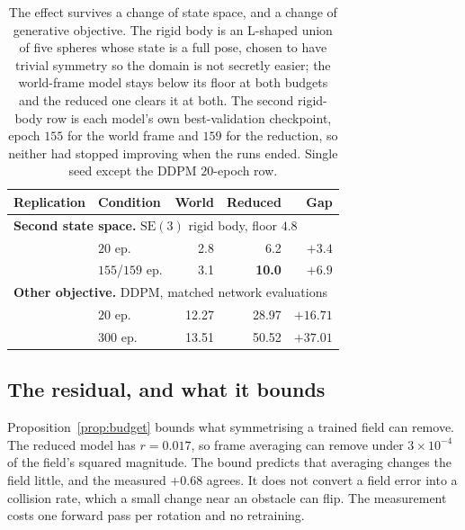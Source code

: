 \documentclass[conference]{IEEEtran}
\newcommand{\SE}{\mathrm{SE}(3)}
\begin{document}
\begin{table}[t]
\centering
\footnotesize
\setlength{\tabcolsep}{3.5pt}
\begin{tabular}{@{}llrrr@{}}
\toprule
Replication & Condition & World & Reduced & Gap \\
\midrule
\multicolumn{5}{l}{\textbf{Second state space.} $\SE$ rigid body, floor $4.8$}\\
            & $20$ ep.       & 2.8 & 6.2 & $+3.4$ \\
            & $155$/$159$ ep.& 3.1 & \textbf{10.0} & $+6.9$ \\
\midrule
\multicolumn{5}{l}{\textbf{Other objective.} DDPM, matched network evaluations}\\
            & $20$ ep.       & 12.27 & 28.97 & $+16.71$ \\
            & $300$ ep.      & 13.51 & 50.52 & $\mathbf{+37.01}$ \\
\bottomrule
\end{tabular}
\caption{The effect survives a change of state space, and a change of generative
objective. The rigid body is an L-shaped union
of five spheres whose state is a full pose, chosen to have trivial symmetry so
the domain is not secretly easier; the world-frame model stays below its floor at both
budgets and the reduced one clears it at both. The second rigid-body row is each model's
own best-validation checkpoint, epoch $155$ for the world frame and $159$ for the
reduction, so neither had stopped improving when the runs ended. Single seed except the DDPM $20$-epoch row.}
\label{tab:replications}
\end{table}

\subsection{The residual, and what it bounds}
\label{sec:residual}
Proposition~\ref{prop:budget} bounds what symmetrising a trained field can remove. The reduced
model has $r = 0.017$, so frame averaging can remove under $3 \times 10^{-4}$ of
the field's squared magnitude. The bound predicts that averaging changes the
field little, and the measured $+0.68$ agrees. It does not convert a field error
into a collision rate, which a small change near an obstacle can flip. The measurement costs one forward pass per rotation and no
retraining.
\end{document}
